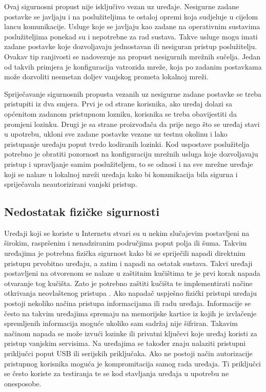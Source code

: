 \documentclass[times, utf8, diplomski]{fer}
\begin{document}
Ovaj sigurnosni propust nije isključivo vezan uz uređaje. Nesigurne zadane postavke se javljaju i na poslužiteljima te ostaloj opremi koja sudjeluje u cijelom lancu komunikacije. Usluge koje se javljaju kao zadane na operativnim sustavima poslužiteljima ponekad su i nepotrebne za rad sustava. Takve usluge mogu imati zadane postavke koje dozvoljavaju jednostavan ili nesiguran pristup poslužitelju. Ovakav tip ranjivosti se nadovezuje na propust nesigurnih mrežnih sučelja. Jedan od takvih primjera je konfiguracija vatrozida mreže, koja po zadanim postavkama može dozvoliti nesmetan doljev vanjskog prometa lokalnoj mreži.  

Spriječavanje sigurnosnih propusta vezanih uz nesigurne zadane postavke se treba pristupiti iz dva smjera. Prvi je od strane korisnika, ako uređaj dolazi sa općenitom zadanom pristupnom lozniku, korisnika se treba obavijestiti da promjeni lozinku. Drugi je sa strane proizvođača da prije nego što se uređaj stavi u upotrebu, ukloni sve zadane postavke vezane uz testnu okolinu i lako pristupanje uređaju poput tvrdo kodiranih lozinki. Kod uspostave poslužitelja potrebno je obratiti pozornost na konfiguraciju mrežnih usluga koje dozvoljavaju pristup i upravljanje samim poslužiteljem, to se odnosi i na sve mrežne uređaje koji se nalaze u lokalnoj mreži uređaja kako bi komunikacija bila sigurna i spriječavala neautorizirani vanjski pristup.

\subsection{Nedostatak fizičke sigurnosti}
Uređaji koji se koriste u Internetu stvari su u nekim slučajevim postavljeni na širokim, raspršenim  i nenadziranim područjima poput polja ili šuma. Takvim uređajima je potrebna fizička sigurnost kako bi se spriječili napadi direktnim pristupu prvobitno uređaju, a zatim i napadi na ostatak sustava. Takvi uređaji postavljeni na otvorenom se nalaze u zaštitnim kučištima te je prvi korak napada otvaranje tog kučišta. Zato je potrebno zaštiti kučišta te implementirati načine otkrivanja neovlaštenog pristupa . Ako napadač uspješno fizički pristupi uređaju postoji nekoliko načina pristupa informacijama ili radu uređaja. Informacije se često na takvim uređajima spremaju na memorijske kartice iz kojih je izvlačenje spremljenih informacija moguće ukoliko sam sadržaj nije šifriran. Takavim načinom napada se može izvući lozinke ili privatni ključevi koje uređaj koristi za pristup vanjskim servisima. Na uređajima se također znaju nalaziti pristupni priključci poput USB ili serijskih priključaka. Ako ne postoji način autorizacije pristupnog korisnika moguća je kompromitacija samog rada uređaja. Ti priključci se često koriste za testiranja te se kod stavljanja uređaja u upotrebu ne onesposobe.
\end{document}
